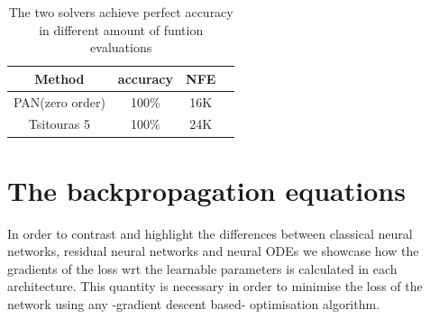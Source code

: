 \documentclass[11pt]{report}
\begin{document}
    \begin{table}[!h]
        \begin{center}
            \caption{The two solvers achieve perfect accuracy in different amount of funtion evaluations}
            \label{moons_metics}
            \renewcommand{\arraystretch}{1.5}
            \renewcommand{\tabcolsep}{10.25pt}
            \begin{tabular}{|c|c|c|c|}
                \hline
                Method          & accuracy & NFE \\
                \hline
                PAN(zero order) & 100\%    & 16K \\
                \hline
                Tsitouras 5     & 100\%    & 24K \\
                \hline
            \end{tabular}
        \end{center}
    \end{table}


    \newpage
    \printbibliography

    \appendix


    \chapter{The backpropagation equations}
    In order to contrast and highlight the differences between classical neural networks, residual neural networks and
    neural ODEs we showcase how the gradients of the loss wrt the learnable parameters is calculated in each architecture.
    This quantity is necessary in order to minimise the loss of the network using any -gradient descent based- optimisation algorithm.
\end{document}
